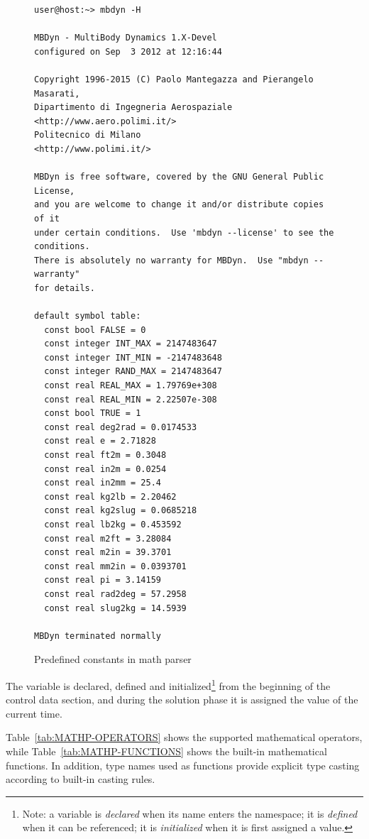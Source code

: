\begin{figure}
\label{fig:MBDYN-H}
\centering
\small
\begin{minipage}{120mm}
\begin{verbatim}
user@host:~> mbdyn -H

MBDyn - MultiBody Dynamics 1.X-Devel
configured on Sep  3 2012 at 12:16:44

Copyright 1996-2015 (C) Paolo Mantegazza and Pierangelo Masarati,
Dipartimento di Ingegneria Aerospaziale <http://www.aero.polimi.it/>
Politecnico di Milano                   <http://www.polimi.it/>

MBDyn is free software, covered by the GNU General Public License,
and you are welcome to change it and/or distribute copies of it
under certain conditions.  Use 'mbdyn --license' to see the conditions.
There is absolutely no warranty for MBDyn.  Use "mbdyn --warranty"
for details.

default symbol table:
  const bool FALSE = 0
  const integer INT_MAX = 2147483647
  const integer INT_MIN = -2147483648
  const integer RAND_MAX = 2147483647
  const real REAL_MAX = 1.79769e+308
  const real REAL_MIN = 2.22507e-308
  const bool TRUE = 1
  const real deg2rad = 0.0174533
  const real e = 2.71828
  const real ft2m = 0.3048
  const real in2m = 0.0254
  const real in2mm = 25.4
  const real kg2lb = 2.20462
  const real kg2slug = 0.0685218
  const real lb2kg = 0.453592
  const real m2ft = 3.28084
  const real m2in = 39.3701
  const real mm2in = 0.0393701
  const real pi = 3.14159
  const real rad2deg = 57.2958
  const real slug2kg = 14.5939

MBDyn terminated normally
\end{verbatim}
\end{minipage}
\caption{Predefined constants in math parser}
\end{figure}

The variable  is declared, defined and initialized\footnote{
    Note: a variable is \emph{declared} when its name enters the namespace;
    it is \emph{defined} when it can be referenced;
    it is \emph{initialized} when it is first assigned a value.
} from the beginning of the control data section, and during the solution 
phase it is assigned the value of the current time. 

Table~\ref{tab:MATHP-OPERATORS} shows the supported mathematical 
operators, while Table~\ref{tab:MATHP-FUNCTIONS} shows the built-in
mathematical functions.
In addition, type names used as functions provide explicit type casting
according to built-in casting rules.

